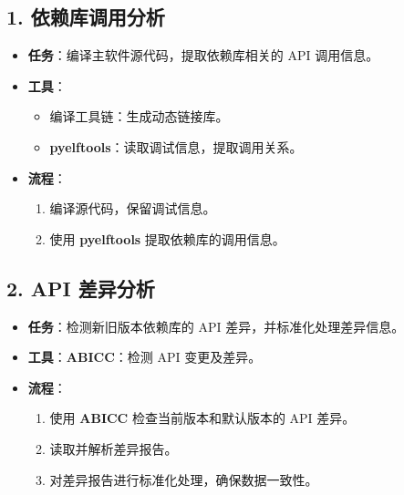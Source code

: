 \documentclass[14pt,a4paper,UTF8,twoside]{article}
\begin{document}
\begin{multicols}{3} %

    \subsection*{1. 依赖库调用分析}
    \begin{itemize}
        \item \textbf{任务}：编译主软件源代码，提取依赖库相关的 API 调用信息。
        \item \textbf{工具}：
        \begin{itemize}
            \item 编译工具链：生成动态链接库。
            \item \textbf{pyelftools}：读取调试信息，提取调用关系。
        \end{itemize}
        \item \textbf{流程}：
        \begin{enumerate}
            \item 编译源代码，保留调试信息。
            \item 使用 \textbf{pyelftools} 提取依赖库的调用信息。
        \end{enumerate}
    \end{itemize}

    \columnbreak %

    \subsection*{2. API 差异分析}
    \begin{itemize}
        \item \textbf{任务}：检测新旧版本依赖库的 API 差异，并标准化处理差异信息。
        \item \textbf{工具}：\textbf{ABICC}：检测 API 变更及差异。
        \item \textbf{流程}：
        \begin{enumerate}
            \item 使用 \textbf{ABICC} 检查当前版本和默认版本的 API 差异。
            \item 读取并解析差异报告。
            \item 对差异报告进行标准化处理，确保数据一致性。
        \end{enumerate}
    \end{itemize}

    \columnbreak %


\end{multicols}
\end{document}
